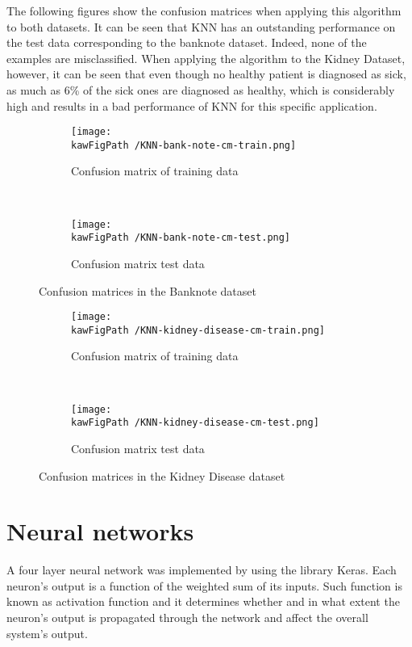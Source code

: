 \documentclass[11pt,a4paper]{article}
\def \kawFigPath {Output/Images}
\begin{document}
The following figures show the confusion matrices when applying this algorithm to both datasets. It can be seen that KNN has an outstanding performance on the test data corresponding to the banknote dataset. Indeed, none of the examples are misclassified. When applying the algorithm to the Kidney Dataset, however, it can be seen that even though no healthy patient is diagnosed as sick, as much as 6\% of the sick ones are diagnosed as healthy, which is considerably high and results in a bad performance of KNN for this specific application. 

\begin{figure}[ht]
    \centering
    \begin{subfigure}[b]{0.45\textwidth} %
        \centering \texttt{[image: \\kawFigPath /KNN-bank-note-cm-train.png]}
        \caption{Confusion matrix of training data}\label{ligne_on}
    \end{subfigure}
    ~
    \begin{subfigure}[b]{0.45\textwidth}
        \centering \texttt{[image: \\kawFigPath /KNN-bank-note-cm-test.png]}
        \caption{Confusion matrix test data}\label{ligne_off}
    \end{subfigure}
    \caption{Confusion matrices in the Banknote dataset}\label{figxx}
\end{figure}

\begin{figure}[ht]
    \centering
    \begin{subfigure}[b]{0.45\textwidth} %
        \centering \texttt{[image: \\kawFigPath /KNN-kidney-disease-cm-train.png]}
        \caption{Confusion matrix of training data}\label{ligne_on}
    \end{subfigure}
    ~
    \begin{subfigure}[b]{0.45\textwidth}
        \centering \texttt{[image: \\kawFigPath /KNN-kidney-disease-cm-test.png]}
        \caption{Confusion matrix test data}\label{ligne_off}
    \end{subfigure}
    \caption{Confusion matrices in the Kidney Disease dataset}\label{figxx}
\end{figure}

\section{Neural networks}
A four layer neural network was implemented by using the library Keras. Each neuron's output is a function of the weighted sum of its inputs. Such function is known as activation function and it determines whether and in what extent the neuron's output is propagated through the network and affect the overall system's output. 
\end{document}
